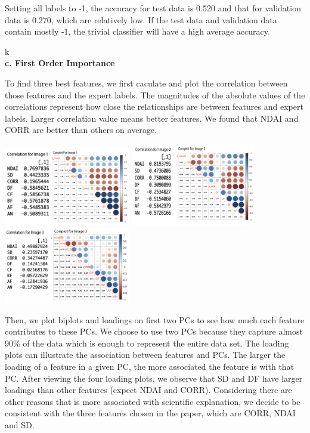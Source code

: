 \documentclass[11pt]{article}
\begin{document}
Setting all labels to -1, the accuracy for test data is 0.520 and that for validation data is 0.270, which are relatively low. If the test data and validation data contain mostly -1, the trivial classifier will have a high average accuracy.

\vspace{0.3cm}k
\mbox{}\\
\textbf{c. First Order Importance}

To find three best features, we first caculate and plot the correlation between those features and the expert labels. The magnitudes of the absolute values of the correlations represent how close the relationships are between features and expert labels. Larger correlation value means better features. We found that NDAI and CORR are better than others on average. 

\includegraphics[width = 5.5cm]{2(c)image1.png}
\includegraphics[width = 5.5cm]{2(c)image2.png}
\includegraphics[width = 5.5cm]{2(c)image3.png}

Then, we plot biplots and loadings on first two PCs to see how much each feature contributes to these PCs. We choose to use two PCs because they capture almost 90\% of the data which is enough to represent the entire data set. The loading plots can illustrate the association between features and PCs. The larger the loading of a feature in a given PC, the more associated the feature is with that PC. After viewing the four loading plots, we observe that SD and DF have larger loadings than other features (expect NDAI and CORR). Considering there are other reasons that is more associated with scientific explanation, we decide to be consistent with the three features chosen in the paper, which are CORR, NDAI and SD.
\end{document}
